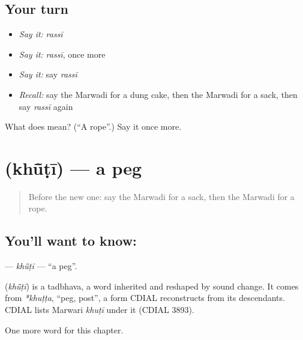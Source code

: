 \subsection*{Your turn}
\begin{itemize}
\raggedright
  \item \emph{Say it:} \emph{rassī}
  \item \emph{Say it:} \emph{rassī}, once more
  \item \emph{Say it:} say \emph{rassī}
  \item \emph{Recall:} say the Marwadi for a dung cake, then the Marwadi for a sack, then say \emph{rassī} again
\end{itemize}

\begin{tcolorbox}[breakable,colback=teal!4,colframe=teal!35!black,title={Before you move on}]
What does  mean? (\textquotedblleft{}A rope\textquotedblright{}.) Say it once more.
\end{tcolorbox}
\section[\texorpdfstring{\mw{खूंटी} (khū̃ṭī)}{खूंटी (khū̃ṭī)}]{ (khū̃ṭī) — a peg}

\label{lesson:MW-C126-khuti}



\begin{quote}
Before the new one: say the Marwadi for a sack, then the Marwadi for a rope.
\end{quote}

\subsection*{You'll want to know: }
\textbf{} — \emph{khū̃ṭī} — \textquotedblleft{}a peg\textquotedblright{}.

\begin{cousinweb}
\textbf{} (\emph{khū̃ṭī}) is a tadbhava, a word inherited and reshaped by sound change. It comes from \emph{*khuṭṭa}, \textquotedblleft{}peg, post\textquotedblright{}, a form CDIAL reconstructs from its descendants. CDIAL lists Marwari \emph{khuṭī} under it (CDIAL 3893).
\end{cousinweb}

\begin{grammarlens}[title={What you've built}]
One more word for this chapter.
\end{grammarlens}

